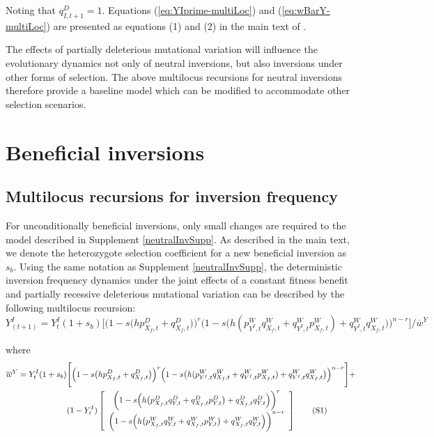 \documentclass{article}
\newcommand\numberthis{\addtocounter{equation}{1}\tag{\theequation}}
\begin{document}
\begin{appendices}
\noindent Noting that $q^{D}_{I,{t+1}} = 1$. Equations (\ref{eq:YIprime-multiLoc}) and (\ref{eq:wBarY-multiLoc}) are presented as equations (1) and (2) in the main text of \citet{Olito-etal-2022}.

\bigskip

 The effects of partially deleterious mutational variation will influence the evolutionary dynamics not only of neutral inversions, but also inversions under other forms of selection. The above multilocus recursions for neutral inversions therefore provide a baseline model which can be modified to accommodate other selection scenarios.



\section{Beneficial inversions}\label{BenInvSupp}

\subsection{Multilocus recursions for inversion frequency} \label{subsec:multilocYI-ben}

For unconditionally beneficial inversions, only small changes are required to the model described in Supplement \ref{neutralInvSupp}. As described in the main text, we denote the heterozygote selection coefficient for a new beneficial inversion as $s_b$. Using the same notation as Supplement \ref{neutralInvSupp}, the deterministic inversion frequency dynamics under the joint effects of a constant fitness benefit and partially recessive deleterious mutational variation can be described by the following multilocus recursion:
\begin{equation} \label{eq:YIprime-ben-multiLoc}
	Y^I_{(t + 1)} = Y^I_t (1 + s_b) \Bigg[ \Big(1 - s \big(h p^{D}_{X_f,t} + q^{D}_{X_f,t} \big) \Big)^{r}\Big(1 - s \big(h (p^{W}_{Y^I,t} q^{W}_{X_f,t} + q^{W}_{Y^I,t} p^{W}_{X_f,t}) + q^{W}_{Y^I,t} q^{W}_{X_f,t} \big) \Big)^{n-r} \Bigg] \Bigg/ \overline{w}^Y
\end{equation}

\noindent where 
\begin{align*}\label{eq:wBarY-ben-multiLoc}
	\overline{w}^Y = Y^I_t (1 + s_b) &\Bigg[ \Big(1 - s \big(h p^{D}_{X_f,t} + q^{D}_{X_f,t} \big) \Big)^{r}\Big(1 - s \big(h (p^{W}_{Y^I,t} q^{W}_{X_f,t} + q^{W}_{Y^I,t} p^{W}_{X_f,t}) + q^{W}_{Y^I,t} q^{W}_{X_f,t} \big) \Big)^{n-r} \Bigg] + \\
	&(1 - Y^I_t) \left[\begin{array}{c}
											\bigg( 1 - s \Big( h \big( p^{D}_{X_f,t} q^{D}_{Y,t} +  q^{D}_{X_f,t} p^{D}_{Y,t} \big) + q^{D}_{X_f,t} q^{D}_{Y,t} \Big) \bigg)^r\\
											\bigg( 1 - s \Big( h \big( p^{W}_{X_f,t} q^{W}_{Y,t} +  q^{W}_{X_f,t} p^{W}_{Y,t} \big) + q^{W}_{X_f,t} q^{W}_{Y,t} \Big) \bigg)^{n-r}
											\end{array} \right] \numberthis
\end{align*}





\end{appendices}
\end{document}
